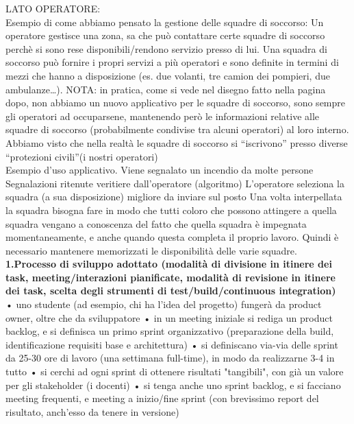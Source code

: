 \documentclass[10pt,english]{article}
\begin{document}
LATO OPERATORE: \\
Esempio di come abbiamo pensato la gestione delle squadre di soccorso: 
Un operatore gestisce una zona, sa che può contattare certe squadre di soccorso perchè si sono rese disponibili/rendono servizio presso di lui. Una squadra di soccorso può fornire i propri servizi a più operatori e sono definite in termini di mezzi che hanno a disposizione (es. due volanti, tre camion dei pompieri, due ambulanze…). 
{NOTA: in pratica, come si vede nel disegno fatto nella pagina dopo, non abbiamo un nuovo applicativo per le squadre di soccorso, sono sempre gli operatori ad occuparsene, mantenendo però le informazioni relative alle squadre di soccorso (probabilmente condivise tra alcuni operatori) al loro interno. Abbiamo visto che nella realtà le squadre di soccorso si “iscrivono” presso diverse “protezioni civili”(i nostri operatori)}\\

Esempio d’uso applicativo.
Viene segnalato un incendio da molte persone 
Segnalazioni ritenute veritiere dall’operatore (algoritmo)
L’operatore seleziona la squadra (a sua disposizione) migliore da inviare sul posto 
Una volta interpellata la squadra bisogna fare in modo che tutti coloro che possono attingere a quella squadra vengano a conoscenza del fatto che quella squadra è impegnata momentaneamente, e anche quando questa completa il proprio lavoro. Quindi è necessario mantenere memorizzati le disponibilità delle varie squadre.\\



\textbf{1.Processo di sviluppo adottato (modalità di divisione in itinere dei task, meeting/interazioni pianificate, modalità di revisione in itinere dei task, scelta degli strumenti di test/build/continuous integration)} \\

•	uno studente (ad esempio, chi ha l'idea del progetto) fungerà da product owner, oltre che da sviluppatore
•	in un meeting iniziale si rediga un product backlog, e si definisca un primo sprint organizzativo (preparazione della build, identificazione requisiti base e architettura)
•	si definiscano via-via delle sprint da 25-30 ore di lavoro (una settimana full-time), in modo da realizzarne 3-4 in tutto
•	si cerchi ad ogni sprint di ottenere risultati "tangibili", con già un valore per gli stakeholder (i docenti)
•	si tenga anche uno sprint backlog, e si facciano meeting frequenti, e meeting a inizio/fine sprint (con brevissimo report del risultato, anch'esso da tenere in versione)
\end{document}
